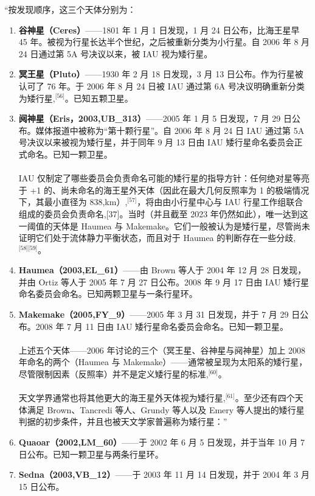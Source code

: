 “按发现顺序，这三个天体分别为：

\begin{enumerate}
\item \textbf{谷神星（Ceres）}——1801 年 1 月 1 日发现，1 月 24 日公布，比海王星早 45 年。被视为行星长达半个世纪，之后被重新分类为小行星。自 2006 年 8 月 24 日通过第 5A 号决议以来，被 IAU 视为矮行星。
\item \textbf{冥王星（Pluto）}——1930 年 2 月 18 日发现，3 月 13 日公布。作为行星被认可了 76 年。于 2006 年 8 月 24 日被 IAU 通过第 6A 号决议明确重新分类为矮行星,\(^\text{[56]}\)。已知五颗卫星。
\item \textbf{阋神星（Eris，2003,UB_{313}）}——2005 年 1 月 5 日发现，7 月 29 日公布。媒体报道中被称为“第十颗行星”。自 2006 年 8 月 24 日 IAU 通过第 5A 号决议以来被视为矮行星，并于同年 9 月 13 日由 IAU 矮行星命名委员会正式命名。已知一颗卫星。\\\\
IAU 仅制定了哪些委员会负责命名可能的矮行星的指导方针：任何绝对星等亮于 +1 的、尚未命名的海王星外天体（因此在最大几何反照率为 1 的极端情况下，其最小直径为 838,km）,\(^\text{[57]}\)，将由由小行星中心与 IAU 行星工作组联合组成的委员会负责命名,[37]。当时（并且截至 2023 年仍然如此），唯一达到这一阈值的天体是 Haumea 与 Makemake。它们一般被认为是矮行星，尽管尚未证明它们处于流体静力平衡状态，而且对于 Haumea 的判断存在一些分歧,\(^\text{[58][59]}\)。
\item \textbf{Haumea（2003,EL_{61}）}——由 Brown 等人于 2004 年 12 月 28 日发现，并由 Ortiz 等人于 2005 年 7 月 27 日公布。2008 年 9 月 17 日由 IAU 矮行星命名委员会命名。已知两颗卫星与一条行星环。
\item \textbf{Makemake（2005,FY_{9}）}——2005 年 3 月 31 日发现，并于 7 月 29 日公布。2008 年 7 月 11 日由 IAU 矮行星命名委员会命名。已知一颗卫星。\\\\
上述五个天体——2006 年讨论的三个（冥王星、谷神星与阋神星）加上 2008 年命名的两个（Haumea 与 Makemake）——通常被呈现为太阳系的矮行星，尽管限制因素（反照率）并不是定义矮行星的标准,\(^\text{[60]}\)。\\\\
天文学界通常也将其他更大的海王星外天体视为矮行星,\(^\text{[61]}\)。至少还有四个天体满足 Brown、Tancredi 等人、Grundy 等人以及 Emery 等人提出的矮行星判据的初步条件，并且也被天文学家普遍称为矮行星：”
\item \textbf{Quaoar（2002,LM_{60}）}——于 2002 年 6 月 5 日发现，并于当年 10 月 7 日公布。已知一颗卫星与两条行星环。
\item \textbf{Sedna（2003,VB_{12}）}——于 2003 年 11 月 14 日发现，并于 2004 年 3 月 15 日公布。

\end{enumerate}
